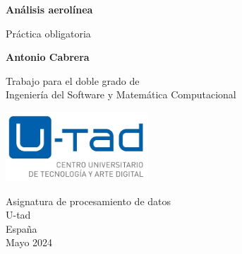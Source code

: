 \documentclass{report}
\begin{document}
\begin{titlepage}
    \begin{center}
        \vspace*{1cm}
 
        \Large\textbf{Análisis aerolínea}
 
        \vspace{0.5cm}
        Práctica obligatoria 
             
        \vspace{1.5cm}
 
        \textbf{Antonio Cabrera}
 
        \vfill
             
        Trabajo para el doble grado de\\
        Ingeniería del Software y Matemática Computacional\\
             
        \vspace{0.8cm}
      
        \includegraphics[width=0.4\textwidth]{figures/logo.png}
             
        Asignatura de procesamiento de datos\\
        U-tad\\
        España\\
        Mayo 2024
             
    \end{center}
 \end{titlepage}

\tableofcontents
\listoffigures




\end{document}
